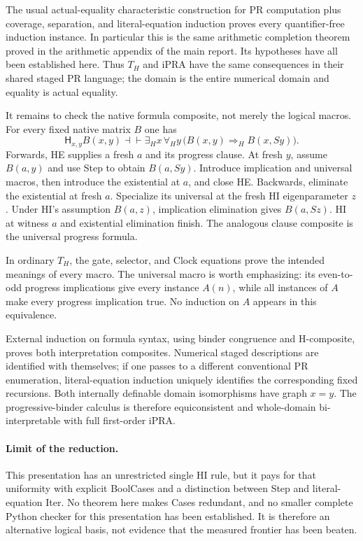 \documentclass[11pt,letterpaper]{article}
\theoremstyle{definition}\newtheorem{definition}[theorem]{Definition}
\theoremstyle{remark}\newtheorem{remark}[theorem]{Remark}
\begin{document}
The usual actual-equality characteristic construction for
PR computation plus coverage, separation, and literal-equation
induction proves every quantifier-free induction instance.  In
particular this is the same arithmetic completion theorem proved in
the arithmetic appendix of the main report.  Its hypotheses have all
been established here.  Thus $T_H$ and iPRA have the same consequences
in their shared staged PR language; the domain is the entire numerical
domain and equality is actual equality.

It remains to check the native formula composite, not merely the
logical macros.  For every fixed native matrix $B$ one has
\[
 \mathsf H_{x,y}B(x,y)\dashv\vdash
 \exists_H x\,\forall_H y\,
       \bigl(B(x,y)\Rightarrow_H B(x,Sy)\bigr).
 \tag{H-composite}
\]
Forwards, HE supplies a fresh $a$ and its progress clause.  At fresh
$y$, assume $B(a,y)$ and use Step to obtain $B(a,Sy)$.  Introduce
implication and universal macros, then introduce the existential at
$a$, and close HE.  Backwards, eliminate the existential at fresh
$a$.  Specialize its universal at the fresh HI eigenparameter $z$.
Under HI's assumption $B(a,z)$, implication elimination gives
$B(a,Sz)$.  HI at witness $a$ and existential elimination finish.
The analogous clause composite is the universal progress formula.

In ordinary $T_H$, the gate, selector, and Clock equations prove the
intended meanings of every macro.  The universal macro is worth
emphasizing: its even-to-odd progress implications give every instance
$A(n)$, while all instances of $A$ make every progress implication
true.  No induction on $A$ appears in this equivalence.

External induction on formula syntax, using binder congruence and
H-composite, proves both interpretation composites.  Numerical staged
descriptions are identified with themselves; if one passes to a
different conventional PR enumeration, literal-equation induction
uniquely identifies the corresponding fixed recursions.  Both
internally definable domain isomorphisms have graph $x=y$.
The progressive-binder calculus is therefore equiconsistent and
whole-domain bi-interpretable with full first-order iPRA.

\paragraph{Limit of the reduction.}
This presentation has an unrestricted single HI rule, but it pays for
that uniformity with explicit BoolCases and a distinction between Step and
literal-equation Iter.  No theorem here makes Cases redundant, and no
smaller complete Python checker for this presentation has been
established.  It is therefore an alternative logical basis, not evidence
that the measured frontier has been beaten.
\end{document}
